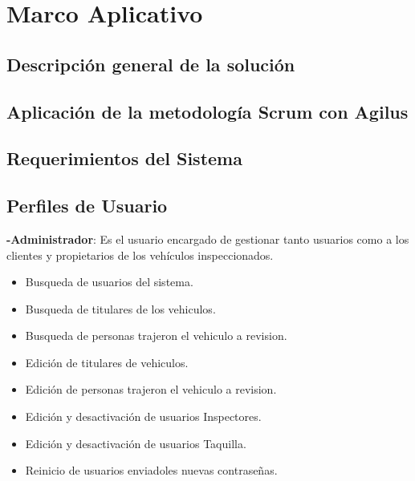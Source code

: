 \chapter{Marco Aplicativo}


\section{Descripción general de la solución} 
\setlength{\parskip}{5mm}
\setlength{\parskip}{0mm}


\section{Aplicación de la metodología Scrum con Agilus } 
\setlength{\parskip}{5mm}
\setlength{\parskip}{0mm}


\section{Requerimientos del Sistema } 
\setlength{\parskip}{5mm}
\setlength{\parskip}{0mm}


\section{Perfiles de Usuario} 
\setlength{\parskip}{5mm}

\textbf{-Administrador}: Es el usuario encargado de gestionar tanto usuarios como a los clientes y propietarios de los vehículos inspeccionados.
	\begin{itemize}
		\item Busqueda de usuarios del sistema.
		\item Busqueda de titulares de los vehiculos.
		\item Busqueda de personas trajeron el vehiculo a revision. 
		\item Edición de titulares de vehiculos.
		\item Edición de personas trajeron el vehiculo a revision.
		\item Edición y desactivación de usuarios Inspectores.
		\item Edición y desactivación de usuarios Taquilla.
		\item Reinicio de usuarios enviadoles nuevas contraseñas.
	\end{itemize}

